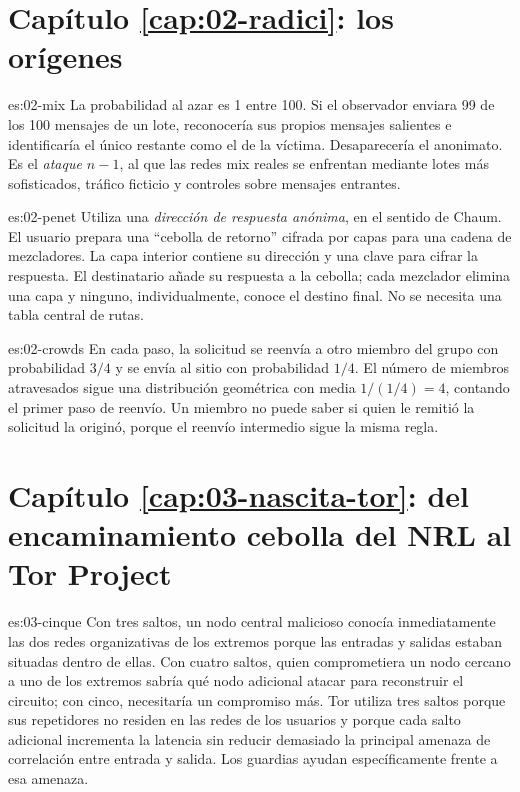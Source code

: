 \section*{Capítulo \ref{cap:02-radici}: los orígenes}

\begin{soluzione}{es:02-mix}
La probabilidad al azar es 1 entre 100. Si el observador enviara 99 de los 100 mensajes de un lote, reconocería sus propios mensajes salientes e identificaría el único restante como el de la víctima. Desaparecería el anonimato. Es el \emph{ataque $n-1$}, al que las redes mix reales se enfrentan mediante lotes más sofisticados, tráfico ficticio y controles sobre mensajes entrantes.
\end{soluzione}

\begin{soluzione}{es:02-penet}
Utiliza una \emph{dirección de respuesta anónima}, en el sentido de Chaum. El usuario prepara una \enquote{cebolla de retorno} cifrada por capas para una cadena de mezcladores. La capa interior contiene su dirección y una clave para cifrar la respuesta. El destinatario añade su respuesta a la cebolla; cada mezclador elimina una capa y ninguno, individualmente, conoce el destino final. No se necesita una tabla central de rutas.
\end{soluzione}

\begin{soluzione}{es:02-crowds}
En cada paso, la solicitud se reenvía a otro miembro del grupo con probabilidad $3/4$ y se envía al sitio con probabilidad $1/4$. El número de miembros atravesados sigue una distribución geométrica con media $1/(1/4)=4$, contando el primer paso de reenvío. Un miembro no puede saber si quien le remitió la solicitud la originó, porque el reenvío intermedio sigue la misma regla.
\end{soluzione}

\section*{Capítulo \ref{cap:03-nascita-tor}: del encaminamiento cebolla del NRL al Tor Project}

\begin{soluzione}{es:03-cinque}
Con tres saltos, un nodo central malicioso conocía inmediatamente las dos redes organizativas de los extremos porque las entradas y salidas estaban situadas dentro de ellas. Con cuatro saltos, quien comprometiera un nodo cercano a uno de los extremos sabría qué nodo adicional atacar para reconstruir el circuito; con cinco, necesitaría un compromiso más. Tor utiliza tres saltos porque sus repetidores no residen en las redes de los usuarios y porque cada salto adicional incrementa la latencia sin reducir demasiado la principal amenaza de correlación entre entrada y salida. Los guardias ayudan específicamente frente a esa amenaza.
\end{soluzione}

